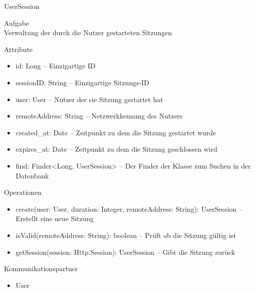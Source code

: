 \newpage
\begin{class}{90}{UserSession}
\item[Aufgabe]~\\
Verwaltung der durch die Nutzer gestarteten Sitzungen
\item[Attribute]~\\
\begin{itemize}
\item id: Long -- Einzigartige ID
\item sessionID: String -- Einzigartige Sitzungs-ID
\item user: User -- Nutzer der sie Sitzung gestartet hat
\item remoteAddress: String -- Netzwerkkennung des Nutzers
\item created\_at: Date -- Zeitpunkt zu dem die Sitzung gestartet wurde
\item expires\_at: Date -- Zeitpunkt zu dem die Sitzung geschlossen wird
\item find: Finder<Long, UserSession> -- Der Finder der Klasse zum Suchen in der Datenbank
\end{itemize}
\item[Operationen]~\\
\begin{itemize}
\item create(user: User, duration: Integer, remoteAddress: String): UserSession -- Erstellt eine neue Sitzung
\item isValid(remoteAddress: String): boolean -- Prüft ob die Sitzung gültig ist
\item getSession(session: Http.Session): UserSession -- Gibt die Sitzung zurück
\end{itemize}
\item[Kommunikationspartner]~\\
\begin{itemize}
\item User
\end{itemize}
\end{class}

